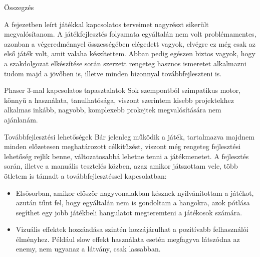 \begin{MyChapter}{Összegzés}
	
	
	A  fejezetben leírt játékkal kapcsolatos terveimet nagyrészt sikerült megvalósítanom. A játékfejlesztés folyamata egyáltalán nem volt problémamentes, azonban a végeredménnyel összességében elégedett vagyok, elvégre ez még csak az első játék volt, amit valaha készítettem.
	Abban pedig egészen biztos vagyok, hogy a szakdolgozat elkészítése során szerzett rengeteg hasznos ismeretet alkalmazni tudom majd a jövőben is, illetve minden bizonnyal továbbfejleszteni is.
	
	\begin{MySection}{Phaser 3-mal kapcsolatos tapasztalatok}
		Sok szempontból szimpatikus motor, könnyű a használata, tanulhatósága, viszont szerintem kisebb projektekhez alkalmas inkább, nagyobb, komplexebb prokejtek megvalósítására nem ajánlanám.
	\end{MySection}
	
	\begin{MySection}{Továbbfejlesztési lehetőségek}
		Bár jelenleg működik a játék, tartalmazva majdnem minden előzetesen meghatározott célkitűzést, viszont még rengeteg fejlesztési lehetőség rejlik benne, változatosabbá lehetne tenni a játékmenetet.
		A fejlesztés során, illetve a manuális tesztelés közben, azaz amikor játszottam vele, több ötletem is támadt a továbbfejlesztéssel kapcsolatban:
		
		\begin{itemize}
			\item Elsősorban, amikor először nagyvonalakban késznek nyilvánítottam a játékot, azután tűnt fel, hogy egyáltalán nem is gondoltam a hangokra, azok pótlása segíthet egy jobb játékbeli hangulatot megteremteni a játékosok számára.
			
			\item Vizuális effektek hozzáadása szintén hozzájárulhat a pozitívabb felhasználói élményhez. Például slow effekt használata esetén megfagyva látszódna az enemy, nem ugyanaz a látvány, csak lassabban.
			

\end{itemize}
\end{MySection}
\end{MyChapter}
